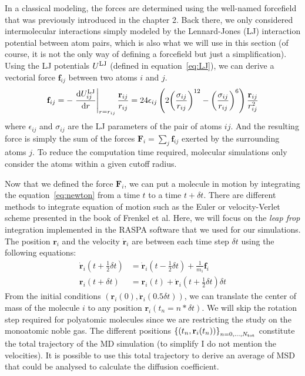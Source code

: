 \documentclass[main]{subfiles}
\begin{document}
In a classical modeling, the forces are determined using the well-named forcefield that was previously introduced in the chapter 2. Back there, we only considered intermolecular interactions simply modeled by the Lennard-Jones (LJ) interaction potential between atom pairs, which is also what we will use in this section (of course, it is not the only way of defining a forcefield but just a simplification). Using the LJ potentials $U^{\text{LJ}}$ (defined in equation~\ref{eq:LJ}), we can derive a vectorial force $\mathbf{f}_{ij}$ between two atoms $i$ and $j$.
\begin{equation}
  \mathbf{f}_{ij} = - \left.{\dfrac{\mathop{}\mathopen{}\mathrm{d} U^{\text{LJ}}_{ij}}{\mathop{}\mathopen{}\mathrm{d} r}}\right\rvert_{r=r_{ij}} \frac{\mathbf{r}_{ij}}{r_{ij}} = 24\epsilon_{ij}  \left(2{\left(\dfrac{\sigma_{ij}}{r_{ij}}\right)}^{12} - {\left(\dfrac{\sigma_{ij}}{r_{ij}}\right)}^{6}\right) \frac{\mathbf{r}_{ij}}{r_{ij}^2}
\end{equation}
where $\epsilon_{ij}$ and $\sigma_{ij}$ are the LJ parameters of the pair of atoms $ij$. And the resulting force is simply the sum of the forces $\mathbf{F}_i=\sum_{j}\mathbf{f}_{ij}$ exerted by the surrounding atoms $j$. To reduce the computation time required, molecular simulations only consider the atoms within a given cutoff radius. 

Now that we defined the force $\mathbf{F}_i$, we can put a molecule in motion by integrating the equation~\ref{eq:newton} from a time $t$ to a time $t+\delta t$. There are different methods to integrate equation of motion such as the Euler or velocity-Verlet scheme presented in the book of Frenkel et al.\autocite{frenkel2001md} Here, we will focus on the \emph{leap frop} integration implemented in the RASPA\autocite{dubbeldam2016} software that we used for our simulations. The position $\mathbf{r}_i$ and the velocity $\dot{\mathbf{r}}_i$ are between each time step $\delta t$ using the following equations:
\begin{equation}\label{eq:frogleap_integration}
  \begin{split}
    \dot{\mathbf{r}}_i\left(t+\tfrac{1}{2}\delta t\right) & = \dot{\mathbf{r}}_i\left(t-\tfrac{1}{2}\delta t\right) + \tfrac{1}{m_i}\mathbf{f}_i \\
    \mathbf{r}_i\left(t+\delta t\right) & = \mathbf{r}_i\left(t\right) + \dot{\mathbf{r}}_i\left(t+\tfrac{1}{2}\delta t\right)\delta t
  \end{split}
\end{equation}
From the initial conditions $(\mathbf{r}_i(0),\dot{\mathbf{r}}_i(0.5\delta t))$, we can translate the center of mass of the molecule $i$ to any position $\mathbf{r}_i(t_n=n*\delta t)$. We will skip the rotation step required for polyatomic molecules since we are restricting the study on the monoatomic noble gas. The different positions ${\left\{\left(t_n,\mathbf{r}_i(t_n)\right)\right\}}_{n=0,\ldots,N_{\text{tot}}}$ constitute the total trajectory of the MD simulation (to simplify I do not mention the velocities). It is possible to use this total trajectory to derive an average of MSD that could be analysed to calculate the diffusion coefficient.
\end{document}
